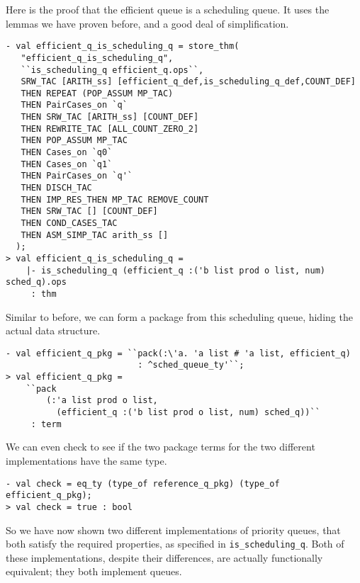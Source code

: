 Here is the proof that the efficient queue is a scheduling queue.
It uses the lemmas we have proven before, 
and a good deal of simplification.
\begin{session}
\begin{verbatim}
- val efficient_q_is_scheduling_q = store_thm(
   "efficient_q_is_scheduling_q",
   ``is_scheduling_q efficient_q.ops``,
   SRW_TAC [ARITH_ss] [efficient_q_def,is_scheduling_q_def,COUNT_DEF]
   THEN REPEAT (POP_ASSUM MP_TAC)
   THEN PairCases_on `q`
   THEN SRW_TAC [ARITH_ss] [COUNT_DEF]
   THEN REWRITE_TAC [ALL_COUNT_ZERO_2]
   THEN POP_ASSUM MP_TAC
   THEN Cases_on `q0`
   THEN Cases_on `q1`
   THEN PairCases_on `q'`
   THEN DISCH_TAC
   THEN IMP_RES_THEN MP_TAC REMOVE_COUNT
   THEN SRW_TAC [] [COUNT_DEF]
   THEN COND_CASES_TAC
   THEN ASM_SIMP_TAC arith_ss []
  );
> val efficient_q_is_scheduling_q =
    |- is_scheduling_q (efficient_q :('b list prod o list, num) sched_q).ops
     : thm
\end{verbatim}
\end{session}

Similar to before, we can form a package from this scheduling queue,
hiding the actual data structure.
\begin{session}
\begin{verbatim}
- val efficient_q_pkg = ``pack(:\'a. 'a list # 'a list, efficient_q)
                          : ^sched_queue_ty'``;
> val efficient_q_pkg =
    ``pack
        (:'a list prod o list,
          (efficient_q :('b list prod o list, num) sched_q))``
     : term
\end{verbatim}
\end{session}

We can even check to see if the two package terms for the two
different implementations have the same type.
\begin{session}
\begin{verbatim}
- val check = eq_ty (type_of reference_q_pkg) (type_of efficient_q_pkg);
> val check = true : bool
\end{verbatim}
\end{session}

So we have now shown two different implementations of priority queues,
that both satisfy the required properties, as specified in 
{\tt is\_scheduling\_q}. Both of these implementations, despite
their differences, are actually functionally equivalent;
they both implement queues.


